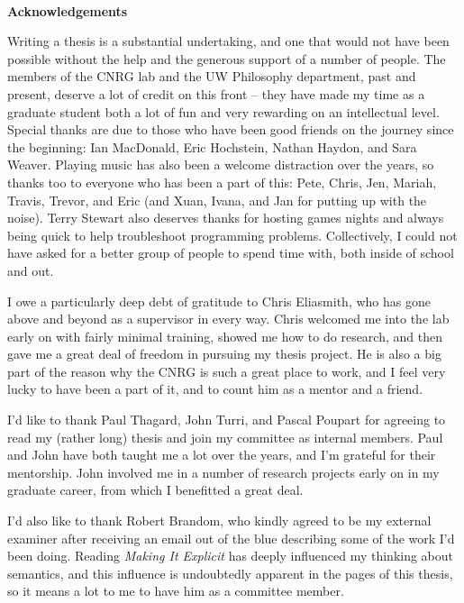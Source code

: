 \cleardoublepage 


\begin{center}\textbf{Acknowledgements}\end{center}

Writing a thesis is a substantial undertaking, and one that would not have been possible without the help and the generous support of a number of people. The members of the CNRG lab and the UW Philosophy department, past and present, deserve a lot of credit on this front -- they have made my time as a graduate student both a lot of fun and very rewarding on an intellectual level. Special thanks are due to those who have been good friends on the journey since the beginning: Ian MacDonald, Eric Hochstein, Nathan Haydon, and Sara Weaver. Playing music has also been a welcome distraction over the years, so thanks too to everyone who has been a part of this: Pete, Chris, Jen, Mariah, Travis, Trevor, and Eric (and Xuan, Ivana, and Jan for putting up with the noise). Terry Stewart also deserves thanks for hosting games nights and always being quick to help troubleshoot programming problems. Collectively, I could not have asked for a better group of people to spend time with, both inside of school and out. 

I owe a particularly deep debt of gratitude to Chris Eliasmith, who has gone above and beyond as a supervisor in every way. Chris welcomed me into the lab early on with fairly minimal training, showed me how to do research, and then gave me a great deal of freedom in pursuing my thesis project. He is also a big part of the reason why the CNRG is such a great place to work, and I feel very lucky to have been a part of it, and to count him as a mentor and a friend.

I'd like to thank Paul Thagard, John Turri, and Pascal Poupart for agreeing to read my (rather long) thesis and join my committee as internal members. Paul and John have both taught me a lot over the years, and I'm grateful for their mentorship. John involved me in a number of research projects early on in my graduate career, from which I benefitted a great deal.

I'd also like to thank Robert Brandom, who kindly agreed to be my external examiner after receiving an email out of the blue describing some of the work I'd been doing. Reading \textit{Making It Explicit} has deeply influenced my thinking about semantics, and this influence is undoubtedly apparent in the pages of this thesis, so it means a lot to me to have him as a committee member. 

